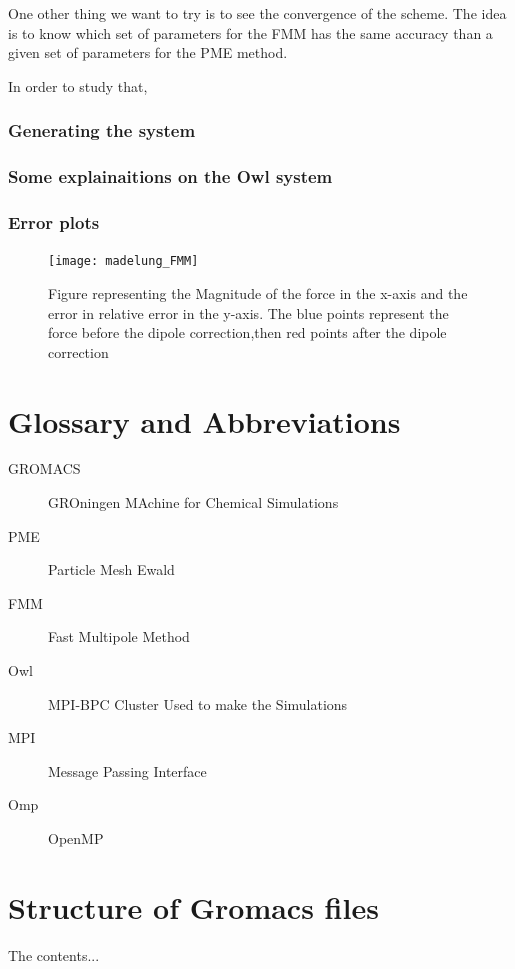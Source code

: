 \documentclass[10pt,twoside,a4paper]{report}
\begin{document}
One other thing we want to try is to see the convergence of the scheme. The idea is to know which set of parameters for the FMM has the same accuracy than a given set of parameters for the PME method. 

In order to study that,

\subsection{Generating the system}
\subsection{Some explainaitions on the Owl system}
\subsection{Error plots}

\begin{figure}[H]
\centering
	\texttt{[image: madelung\_FMM]}
     
    \caption{Figure representing the Magnitude of the force in the x-axis and the  error in relative error in the y-axis. The blue points represent the force before the dipole correction,then red points after the dipole correction}    
   \end{figure}  


\nocite{*}

 

\begin{appendices}
\chapter{Glossary and Abbreviations}

\begin{description}

\item[GROMACS] GROningen MAchine for Chemical Simulations
\item[PME] Particle Mesh Ewald
\item[FMM] Fast Multipole Method
\item[Owl] MPI-BPC Cluster Used to make the Simulations

\item[MPI] Message Passing Interface
\item[Omp] OpenMP

\end{description}


\chapter{Structure of Gromacs files}
The contents...
\end{appendices}
\end{document}
